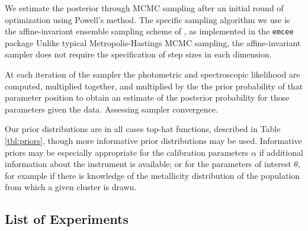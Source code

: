 \documentclass[iop,numberedappendix]{emulateapj}
\begin{document}
We estimate the posterior through MCMC sampling after an initial round
of optimization using Powell's method.  The specific sampling
algorithm we use is the affine-invariant ensemble sampling scheme of
\citet{goodman}, as implemented in the \texttt{emcee} package
\citep{emcee} Unlike typical Metropolis-Hastings MCMC sampling, the
affine-invariant sampler does not require the specification of step
sizes in each dimension.
 
At each iteration of the sampler the photometric and spectroscopic
likelihood are computed, multiplied together, and multiplied by the
the prior probability of that parameter position to obtain an estimate
of the posterior probability for those parameters given the
data. {\color{blue}Assessing sampler convergence.}

Our prior distributions are in all cases top-hat functions, described
in Table \ref{tbl:priors}, though more informative prior distributions
may be used.  Informative priors may be especially appropriate for the
calibration parameters $\alpha$ if additional information about the
instrument is available; or for the parameters of interest $\theta$,
for example if there is knowledge of the metallicity
distribution of the population from which a given cluster is drawn.



\subsection{List of Experiments}
\end{document}
